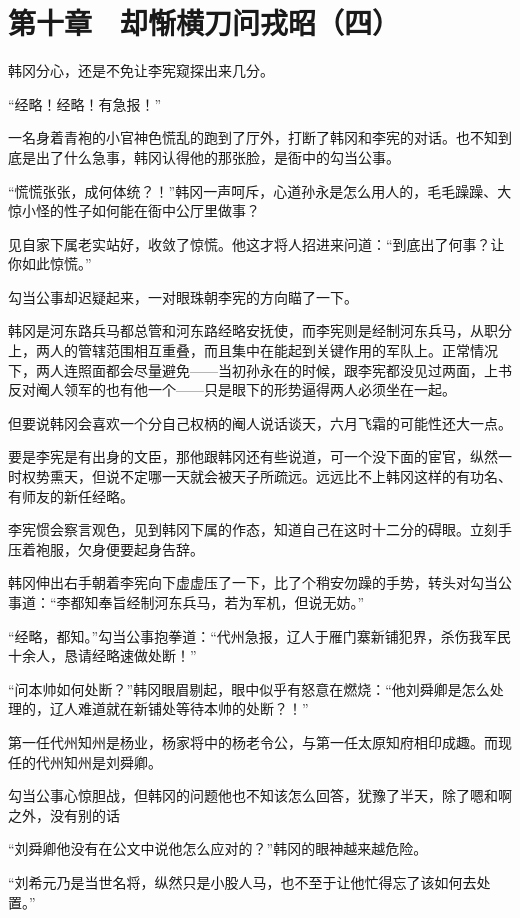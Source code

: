 \section{第十章　却惭横刀问戎昭（四）}

韩冈分心，还是不免让李宪窥探出来几分。

“经略！经略！有急报！”

一名身着青袍的小官神色慌乱的跑到了厅外，打断了韩冈和李宪的对话。也不知到底是出了什么急事，韩冈认得他的那张脸，是衙中的勾当公事。

“慌慌张张，成何体统？！”韩冈一声呵斥，心道孙永是怎么用人的，毛毛躁躁、大惊小怪的性子如何能在衙中公厅里做事？

见自家下属老实站好，收敛了惊慌。他这才将人招进来问道：“到底出了何事？让你如此惊慌。”

勾当公事却迟疑起来，一对眼珠朝李宪的方向瞄了一下。

韩冈是河东路兵马都总管和河东路经略安抚使，而李宪则是经制河东兵马，从职分上，两人的管辖范围相互重叠，而且集中在能起到关键作用的军队上。正常情况下，两人连照面都会尽量避免——当初孙永在的时候，跟李宪都没见过两面，上书反对阉人领军的也有他一个——只是眼下的形势逼得两人必须坐在一起。

但要说韩冈会喜欢一个分自己权柄的阉人说话谈天，六月飞霜的可能性还大一点。

要是李宪是有出身的文臣，那他跟韩冈还有些说道，可一个没下面的宦官，纵然一时权势熏天，但说不定哪一天就会被天子所疏远。远远比不上韩冈这样的有功名、有师友的新任经略。

李宪惯会察言观色，见到韩冈下属的作态，知道自己在这时十二分的碍眼。立刻手压着袍服，欠身便要起身告辞。

韩冈伸出右手朝着李宪向下虚虚压了一下，比了个稍安勿躁的手势，转头对勾当公事道：“李都知奉旨经制河东兵马，若为军机，但说无妨。”

“经略，都知。”勾当公事抱拳道：“代州急报，辽人于雁门寨新铺犯界，杀伤我军民十余人，恳请经略速做处断！”

“问本帅如何处断？”韩冈眼眉剔起，眼中似乎有怒意在燃烧：“他刘舜卿是怎么处理的，辽人难道就在新铺处等待本帅的处断？！”

第一任代州知州是杨业，杨家将中的杨老令公，与第一任太原知府相印成趣。而现任的代州知州是刘舜卿。

勾当公事心惊胆战，但韩冈的问题他也不知该怎么回答，犹豫了半天，除了嗯和啊之外，没有别的话

“刘舜卿他没有在公文中说他怎么应对的？”韩冈的眼神越来越危险。

“刘希元乃是当世名将，纵然只是小股人马，也不至于让他忙得忘了该如何去处置。”

